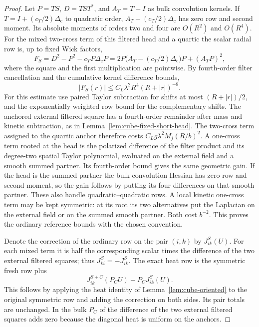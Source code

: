 \documentclass[11pt]{article}
\theoremstyle{definition}
\begin{document}
\begin{proof}
Let \(P=TS\), \(D=TST^*\), and \(A_T=T-I\) as bulk
convolution kernels. If \(T=I+(c_T/2)\Delta_{\mathrm c}\)
to quadratic order, \(A_T-(c_T/2)\Delta_{\mathrm c}\)
has zero row and second moment. Its absolute moments of orders
two and four are \(O(R^2)\) and \(O(R^4)\).
For the mixed two-cross term of this filtered head and a
quartic the scalar radial row is, up to fixed Wick factors,
\begin{equation}
 F_S=D^2-P^2-c_T P\Delta_{\mathrm c}P
      =2P\big(A_T-(c_T/2)\Delta_{\mathrm c}\big)P+(A_TP)^2 ,
\end{equation}
where the square and the first multiplication are pointwise.
By fourth-order filter cancellation and the cumulative kernel
difference bounds,
\begin{equation}
 |F_S(r)|\le C_L\lambda^2 R^4 (R+|r|)^{-8}.
\end{equation}
For this estimate use paired Taylor subtraction for shifts at
most \((R+|r|)/2\), and the exponentially weighted row bound for
the complementary shifts. The anchored external filtered square
has a fourth-order remainder after mass and kinetic subtraction,
as in Lemma~\ref{lem:cube-fixed-short-head}. The two-cross term
assigned to the quartic anchor therefore costs
\(C_Lg\lambda^2 M_j(R/b)^2\). A one-cross term rooted at the head
is the polarized difference of the filter product and its
degree-two spatial Taylor polynomial, evaluated on the external
field and a smooth summed partner. Its fourth-order bound
gives the same geometric gain. If the head is the summed
partner the bulk convolution Hessian has zero row and second
moment, so the gain follows by putting its four differences
on that smooth partner. These also handle quadratic--quadratic
rows. A local kinetic one-cross term may be kept symmetric:
at its root its two alternatives put the Laplacian on the
external field or on the summed smooth partner. Both cost
\(b^{-2}\). This proves the ordinary reference bounds with
the chosen convention.

Denote the correction of the ordinary row on the pair
\((i,k)\) by \(J_{ik}^{S}(U)\). For each mixed term it is half
the corresponding scalar times the difference of the two
external filtered squares; thus \(J_{ki}^{S}=-J_{ik}^{S}\).
The exact heat row is the symmetric fresh row plus
\begin{equation}
 J^{S+C}_{ik}(P_CU)-P_C J^S_{ik}(U).
\end{equation}
This follows by applying the heat identity of
Lemma~\ref{lem:cube-oriented} to the original symmetric row
and adding the correction on both sides. Its pair totals are
unchanged. In the bulk \(P_C\) of the difference of the two
external filtered squares adds zero because the diagonal heat
is uniform on the anchors.


\end{proof}
\end{document}
